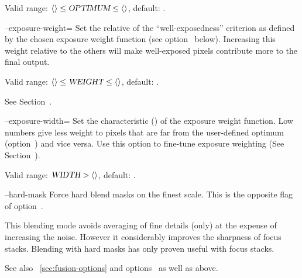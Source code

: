\begin{codelist}
  Valid range: $\val{val:minimum-exposure-optimum} \leq \metavar{OPTIMUM} \leq
  \val{val:maximum-exposure-optimum}$, default: .


  \label{opt:exposure-weight}%
\item[--exposure-weight=\metavar{WEIGHT}]\itemend Set the relative
   of the ``well-exposedness'' criterion as defined by
  the chosen exposure weight function (see
  option~ below).  Increasing this
  weight relative to the others will make well-exposed pixels
  contribute more to the final output.

  Valid range: $\val{val:minimum-weight-exposure} \leq
  \metavar{WEIGHT} \leq \val{val:maximum-weight-exposure}$, default:
  .

  See Section~.


  \label{opt:exposure-width}%
\item[--exposure-width=\metavar{WIDTH}]\itemend
  Set the characteristic  () of the exposure weight function.  Low
  numbers give less weight to pixels that are far from the user-defined optimum
  (option~) and vice versa.  Use this option to fine-tune exposure
  weighting (See Section~).

  Valid range: $\metavar{WIDTH} > \val{val:minimum-exposure-width}$, default:
  .


  \label{opt:hard-mask}%
\item[--hard-mask]\itemend
  Force hard blend masks on the finest scale.  This is the opposite flag of
  option~.

  This blending mode avoids averaging of fine details (only) at the expense of increasing the
  noise.  However it considerably improves the sharpness of focus stacks.  Blending with hard
  masks has only proven useful with focus stacks.

  See also \sectionName~\ref{sec:fusion-options} and options~ as well
  as  above.



\end{codelist}
